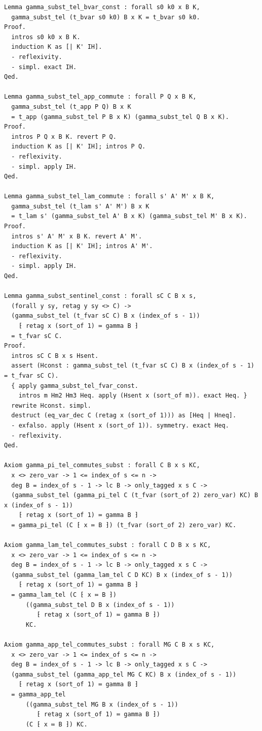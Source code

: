 \begin{latin}
\begin{verbatim}
Lemma gamma_subst_tel_bvar_const : forall s0 k0 x B K,
  gamma_subst_tel (t_bvar s0 k0) B x K = t_bvar s0 k0.
Proof.
  intros s0 k0 x B K.
  induction K as [| K' IH].
  - reflexivity.
  - simpl. exact IH.
Qed.

Lemma gamma_subst_tel_app_commute : forall P Q x B K,
  gamma_subst_tel (t_app P Q) B x K
  = t_app (gamma_subst_tel P B x K) (gamma_subst_tel Q B x K).
Proof.
  intros P Q x B K. revert P Q.
  induction K as [| K' IH]; intros P Q.
  - reflexivity.
  - simpl. apply IH.
Qed.

Lemma gamma_subst_tel_lam_commute : forall s' A' M' x B K,
  gamma_subst_tel (t_lam s' A' M') B x K
  = t_lam s' (gamma_subst_tel A' B x K) (gamma_subst_tel M' B x K).
Proof.
  intros s' A' M' x B K. revert A' M'.
  induction K as [| K' IH]; intros A' M'.
  - reflexivity.
  - simpl. apply IH.
Qed.

Lemma gamma_subst_sentinel_const : forall sC C B x s,
  (forall y sy, retag y sy <> C) ->
  (gamma_subst_tel (t_fvar sC C) B x (index_of s - 1))
    ⁅ retag x (sort_of 1) ≔ gamma B ⁆
  = t_fvar sC C.
Proof.
  intros sC C B x s Hsent.
  assert (Hconst : gamma_subst_tel (t_fvar sC C) B x (index_of s - 1) = t_fvar sC C).
  { apply gamma_subst_tel_fvar_const.
    intros m Hm2 Hm3 Heq. apply (Hsent x (sort_of m)). exact Heq. }
  rewrite Hconst. simpl.
  destruct (eq_var_dec C (retag x (sort_of 1))) as [Heq | Hneq].
  - exfalso. apply (Hsent x (sort_of 1)). symmetry. exact Heq.
  - reflexivity.
Qed.

Axiom gamma_pi_tel_commutes_subst : forall C B x s KC,
  x <> zero_var -> 1 <= index_of s <= n ->
  deg B = index_of s - 1 -> lc B -> only_tagged x s C ->
  (gamma_subst_tel (gamma_pi_tel C (t_fvar (sort_of 2) zero_var) KC) B x (index_of s - 1))
    ⁅ retag x (sort_of 1) ≔ gamma B ⁆
  = gamma_pi_tel (C ⁅ x ≔ B ⁆) (t_fvar (sort_of 2) zero_var) KC.

Axiom gamma_lam_tel_commutes_subst : forall C D B x s KC,
  x <> zero_var -> 1 <= index_of s <= n ->
  deg B = index_of s - 1 -> lc B -> only_tagged x s C ->
  (gamma_subst_tel (gamma_lam_tel C D KC) B x (index_of s - 1))
    ⁅ retag x (sort_of 1) ≔ gamma B ⁆
  = gamma_lam_tel (C ⁅ x ≔ B ⁆)
      ((gamma_subst_tel D B x (index_of s - 1))
         ⁅ retag x (sort_of 1) ≔ gamma B ⁆)
      KC.

Axiom gamma_app_tel_commutes_subst : forall MG C B x s KC,
  x <> zero_var -> 1 <= index_of s <= n ->
  deg B = index_of s - 1 -> lc B -> only_tagged x s C ->
  (gamma_subst_tel (gamma_app_tel MG C KC) B x (index_of s - 1))
    ⁅ retag x (sort_of 1) ≔ gamma B ⁆
  = gamma_app_tel
      ((gamma_subst_tel MG B x (index_of s - 1))
         ⁅ retag x (sort_of 1) ≔ gamma B ⁆)
      (C ⁅ x ≔ B ⁆) KC.


\end{verbatim}
\end{latin}
